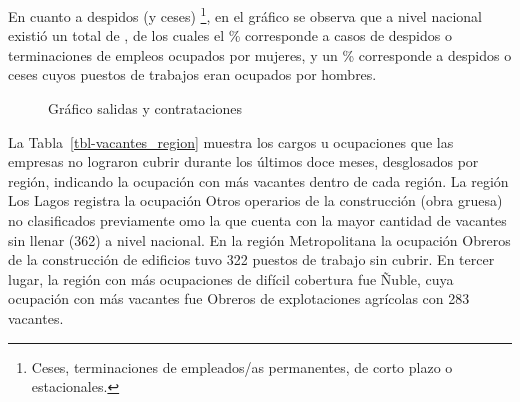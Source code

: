 \documentclass[
  11pt,
]{article}
\begin{document}
En cuanto a despidos (y ceses) \footnote{Ceses, terminaciones de
  empleados/as permanentes, de corto plazo o estacionales.}, en el
gráfico se observa que a nivel nacional existió un total de
, de los cuales el \% corresponde a casos de
despidos o terminaciones de empleos ocupados por mujeres, y un
\% corresponde a despidos o ceses cuyos puestos de trabajos
eran ocupados por hombres.

\FloatBarrier

\begin{figure}[H]

\caption{\label{fig-salidas_contrataciones}Gráfico salidas y
contrataciones}


\end{figure}%

La Tabla~\ref{tbl-vacantes_region} muestra los cargos u ocupaciones que
las empresas no lograron cubrir durante los últimos doce meses,
desglosados por región, indicando la ocupación con más vacantes dentro
de cada región. La región Los Lagos registra la ocupación Otros
operarios de la construcción (obra gruesa) no clasificados previamente
omo la que cuenta con la mayor cantidad de vacantes sin llenar (362) a
nivel nacional. En la región Metropolitana la ocupación Obreros de la
construcción de edificios tuvo 322 puestos de trabajo sin cubrir. En
tercer lugar, la región con más ocupaciones de difícil cobertura fue
Ñuble, cuya ocupación con más vacantes fue Obreros de explotaciones
agrícolas con 283 vacantes.
\end{document}
